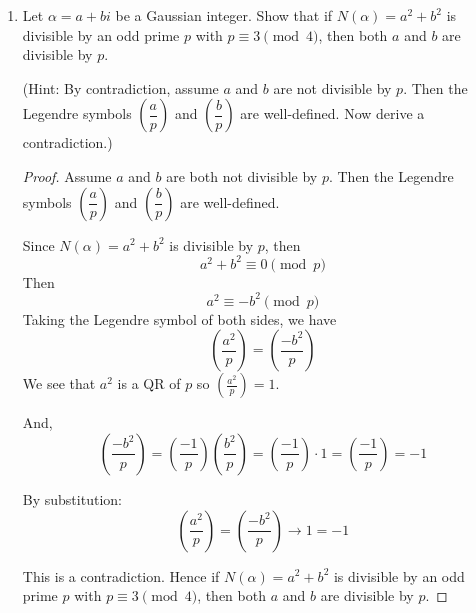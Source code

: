\documentclass[11pt]{article}
\theoremstyle{definition}
\newcommand{\leg}[2]{\genfrac(){}{0}{#1}{#2}}
\newcommand{\legp}[1]{\leg{#1}{p}}
\newcommand{\legendre}[2]{\ensuremath{\left( \frac{#1}{#2} \right) }}
\begin{document}
\begin{enumerate}
\begin{enumerate}
    \end{enumerate}

    \item Let $\alpha = a + bi$ be a Gaussian integer. Show that if $N(\alpha) = a^2 + b^2$ is divisible by an odd prime $p$ with $p\equiv 3 \pmod 4$, then both $a$ and $b$ are divisible by $p$.
    
    (Hint: By contradiction, assume $a$ and $b$ are not divisible by $p$. Then the Legendre symbols $\legp{a}$ and $\legp{b}$ are well-defined. Now derive a contradiction.)
    \begin{proof}
        Assume $a$ and $b$ are both not divisible by $p$. 
        Then the Legendre symbols $\legp{a}$ and $\legp{b}$ are well-defined.

        Since $N(\alpha) = a^2 + b^2$ is divisible by $p$, then
        \[
            a^2 + b^2 \equiv 0\pmod{p}
        \]
        Then 
        \[
            a^2\equiv -b^2\pmod{p}
        \]
        Taking the Legendre symbol of both sides, we have 
        \[
            \legendre{a^2}{p} = \legendre{-b^2}{p}
        \]
        We see that $a^2$ is a QR of $p$ so $\legendre{a^2}{p} = 1$. 

        And, 
        \[
            \legendre{-b^2}{p} = \legendre{-1}{p}\legendre{b^2}{p} = \legendre{-1}{p}\cdot 1 = \legendre{-1}{p} = -1
        \]
        
        By substitution: 
        \[
            \legendre{a^2}{p} = \legendre{-b^2}{p} \rightarrow 1 = -1
        \]

        This is a contradiction. Hence if $N(\alpha) = a^2 + b^2$ is divisible by an odd prime $p$ 
        with $p\equiv 3 \pmod 4$, then both $a$ and $b$ are divisible by $p$.
        
    \end{proof}


\end{enumerate}
\end{document}
